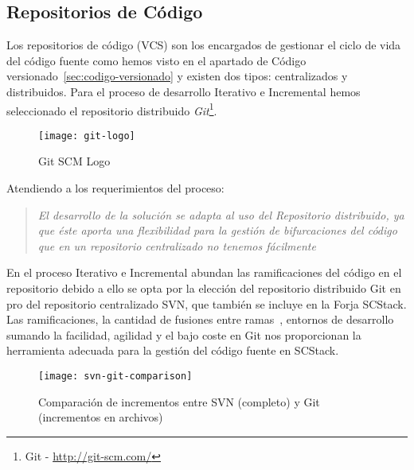 


\subsection{Repositorios de Código}
\label{sub:repositorios}

\par Los repositorios de código (VCS) son los encargados de gestionar el ciclo de vida del código fuente como hemos visto en el apartado de Código versionado~\ref{sec:codigo-versionado} y existen dos tipos: centralizados y distribuidos. Para el proceso de desarrollo Iterativo e Incremental hemos seleccionado el repositorio distribuido \emph{Git}\footnote{Git - \url{http://git-scm.com/}}.

\begin{figure}[H]
    \centering
    \texttt{[image: git-logo]}
    \caption{Git SCM Logo}
    \label{fig:git-scm-logo}
\end{figure}

\par Atendiendo a los requerimientos del proceso:

\begin{quote}
    \emph{El desarrollo de la solución se adapta al uso del Repositorio distribuido, ya que éste aporta una flexibilidad para la gestión de bifurcaciones del código que en un repositorio centralizado no tenemos fácilmente}
\end{quote}

\par En el proceso Iterativo e Incremental abundan las ramificaciones del código en el repositorio debido a ello se opta por la elección del repositorio distribuido Git en pro del repositorio centralizado SVN, que también se incluye en la Forja SCStack. Las ramificaciones, la cantidad de fusiones entre ramas~\cite{featurebranch}, entornos de desarrollo sumando la facilidad, agilidad y el bajo coste en Git nos proporcionan la herramienta adecuada para la gestión del código fuente en SCStack.

\begin{figure}[H]
    \centering
    \texttt{[image: svn-git-comparison]}
    \caption{Comparación de incrementos entre SVN (completo) y Git (incrementos en archivos)}
    \label{fig:svn-git-comparison}
\end{figure}

